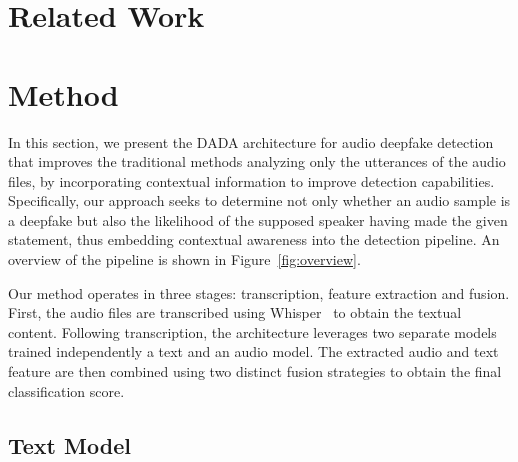 \documentclass{Interspeech}
\begin{document}
\section{Related Work}\label{sec:related_work}

\section{Method}\label{sec:method}

In this section, we present the DADA architecture for audio deepfake detection
that improves the traditional methods analyzing only the utterances of the
audio files, by incorporating contextual information to improve detection
capabilities. Specifically, our approach seeks to determine not only whether an
audio sample is a deepfake but also the likelihood of the supposed speaker
having made the given statement, thus embedding contextual awareness into the
detection pipeline. An overview of the pipeline is shown in
Figure~\ref{fig:overview}.

Our method operates in three stages: transcription, feature extraction and
fusion. First, the audio files are transcribed using
Whisper~\cite{radford2023robust} to obtain the textual content. Following
transcription, the architecture leverages two separate models trained
independently a text and an audio model. The extracted audio and text feature
are then combined using two distinct fusion strategies to obtain the final
classification score.
\subsection{Text Model}
\end{document}
